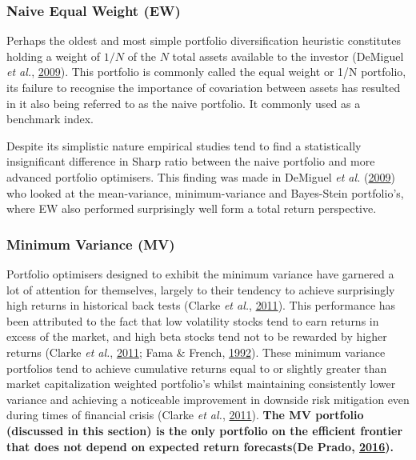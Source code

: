 \documentclass[11pt,preprint, authoryear]{elsarticle}
\numberwithin{equation}{section}
\numberwithin{figure}{section}
\numberwithin{table}{section}
\begin{document}
\hypertarget{naive-equal-weight-ew}{%
\subsubsection{Naive Equal Weight (EW)}\label{naive-equal-weight-ew}}

Perhaps the oldest and most simple portfolio diversification heuristic
constitutes holding a weight of \(1/N\) of the \(N\) total assets
available to the investor (DeMiguel \emph{et al.},
\protect\hyperlink{ref-demiguel2009}{2009}). This portfolio is commonly
called the equal weight or 1/N portfolio, its failure to recognise the
importance of covariation between assets has resulted in it also being
referred to as the naive portfolio. It commonly used as a benchmark
index.

Despite its simplistic nature empirical studies tend to find a
statistically insignificant difference in Sharp ratio between the naive
portfolio and more advanced portfolio optimisers. This finding was made
in DeMiguel \emph{et al.} (\protect\hyperlink{ref-demiguel2009}{2009})
who looked at the mean-variance, minimum-variance and Bayes-Stein
portfolio's, where EW also performed surprisingly well form a total
return perspective.

\hypertarget{minimum-variance-mv}{%
\subsubsection{Minimum Variance (MV)}\label{minimum-variance-mv}}

Portfolio optimisers designed to exhibit the minimum variance have
garnered a lot of attention for themselves, largely to their tendency to
achieve surprisingly high returns in historical back tests (Clarke
\emph{et al.}, \protect\hyperlink{ref-clarke2011}{2011}). This
performance has been attributed to the fact that low volatility stocks
tend to earn returns in excess of the market, and high beta stocks tend
not to be rewarded by higher returns (Clarke \emph{et al.},
\protect\hyperlink{ref-clarke2011}{2011}; Fama \& French,
\protect\hyperlink{ref-fama1992}{1992}). These minimum variance
portfolios tend to achieve cumulative returns equal to or slightly
greater than market capitalization weighted portfolio's whilst
maintaining consistently lower variance and achieving a noticeable
improvement in downside risk mitigation even during times of financial
crisis (Clarke \emph{et al.}, \protect\hyperlink{ref-clarke2011}{2011}).
\textbf{The MV portfolio (discussed in this section) is the only
portfolio on the efficient frontier that does not depend on expected
return forecasts(De Prado, \protect\hyperlink{ref-lopez}{2016}).}
\end{document}
